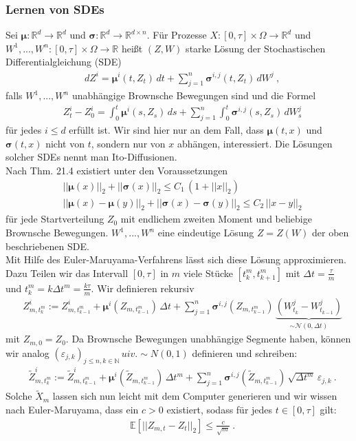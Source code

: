 \documentclass[12pt]{article}
\newcommand{\E}{\mathbb{E}}
\newcommand{\R}{\mathbb{R}}
\newcommand{\tZ}{\widetilde{Z}}
\newcommand{\tX}{\widetilde{X}}
\newcommand{\bmu}{\bm{\mu}}
\newcommand{\bsig}{\bm{\sigma}}
\newcommand{\N}{\mathbb{N}}
\begin{document}
	\subsubsection[Lernen von SDEs]{Lernen von SDEs}
	Sei $\bmu: \R^d \rightarrow \R^d$ und $\bsig: \R^d \rightarrow \R^{d \times n}$. Für Prozesse $X: [0,\tau] \times \Omega \rightarrow \R^d$ und $W^1,...,W^n : [0,\tau] \times \Omega \rightarrow \R$ heißt $(Z,W)$ starke Lösung der Stochastischen Differentialgleichung (SDE)
	\begin{align*}
		& dZ^i = \bmu^i(t,Z_t) \, dt + \sum\limits_{j=1}^n \bsig^{i,j}(t,Z_t) \, dW^j \ ,
	\end{align*}
	falls $W^1,...,W^n$ unabhängige Brownsche Bewegungen sind und die Formel
	\begin{align*}
		& Z_t^i - Z_0^i = \int_0^t \bmu^i(s,Z_s) \, ds + \sum\limits_{j=1}^n \int_0^t \bsig^{i,j}(s,Z_s) \, dW_s^j \tag{1}
	\end{align*}
	für jedes $i \leq d$ erfüllt ist. Wir sind hier nur an dem Fall, dass $\bmu(t,x)$ und $\bsig(t,x)$ nicht von $t$, sondern nur von $x$ abhängen, interessiert. Die Lösungen solcher SDEs nennt man Ito-Diffusionen.\\
	Nach \cite{PfaffiSkript} Thm. 21.4 existiert unter den Voraussetzungen
	\begin{align*}
		& ||\bmu(x)||_2 + ||\bsig(x)||_2 \leq C_1 \, (1+||x||_2)\\
		& ||\bmu(x)-\bmu(y)||_2 + ||\bsig(x)-\bsig(y)||_2 \leq C_2 \, ||x-y||_2 \tag{2}
	\end{align*}
	für jede Startverteilung $Z_0$ mit endlichem zweiten Moment und beliebige Brownsche Bewegungen. $W^1,...,W^n$ eine eindeutige Lösung $Z = Z(W)$ der oben beschriebenen SDE.\\
	Mit Hilfe des Euler-Maruyama-Verfahrens lässt sich diese Lösung approximieren. Dazu Teilen wir das Intervall $[0,\tau]$ in $m$ viele Stücke $[t^m_k,t^m_{k+1}]$ mit $\Delta t = \frac{\tau}{m}$ und $t^m_k = k \Delta t^m = \frac{k\tau}{m}$. Wir definieren rekursiv
	\begin{align*}
		& Z^i_{m,t^m_k} := Z^i_{m,t^m_{k-1}} + \bmu^i(Z_{m,t^m_{k-1}}) \, \Delta t + \sum\limits_{j=1}^n \bsig^{i,j}(Z_{m,t^m_{k-1}}) \, \underbrace{(W^j_{t_k}-W^j_{t_{k-1}})}_{\sim \mathcal{N}(0,\Delta t)}
	\end{align*}
	mit $Z_{m,0} = Z_0$. Da Brownsche Bewegungen unabhängige Segmente haben, können wir analog $(\varepsilon_{j,k})_{j \leq n, k \in \N} \, uiv. \sim N(0,1)$ definieren und schreiben:
	\begin{align*}
		& \tZ^i_{m,t^m_k} := \tZ^i_{m,t^m_{k-1}} + \bmu^i(\tZ_{m,t^m_{k-1}}) \, \Delta t^m + \sum\limits_{j=1}^n \bsig^{i,j}(\tZ_{m,t^m_{k-1}}) \, \sqrt{\Delta t^m} \, \varepsilon_{j,k} \ .
	\end{align*}
	Solche $\tX_m$ lassen sich nun leicht mit dem Computer generieren und wir wissen nach Euler-Maruyama, dass ein $c > 0$ existiert, sodass für jedes $t \in [0,\tau]$ gilt:
	\begin{align*}
		& \E[||Z_{m,t} - Z_t||_2] \leq \frac{c}{\sqrt{m}} \ .
	\end{align*}
\end{document}
